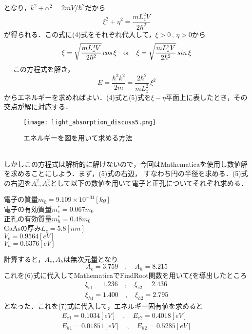 \documentclass[a4paper,11pt,titlepage]{jsarticle}
\begin{document}
となり，$k^2+\alpha^2 = 2mV/\hbar^2$だから\\
\begin{equation}
    \xi^2 + \eta^2 = \frac{mL_z^2V}{2\hbar^2} %
\end{equation}
が得られる．この式に(4)式をそれぞれ代入して，$\xi > 0\,,\,\eta > 0$から
\begin{equation}
    \xi=\sqrt{\frac{mL_z^2V}{2\hbar^2}}\,cos\,\xi\quad{\rm or}\quad \xi=\sqrt{\frac{mL_z^2V}{2\hbar^2}}\,sin\,\xi
\end{equation}　%
この方程式を解き，
\begin{equation}
    E = \frac{\hbar^2k^2}{2m} = \frac{2\hbar^2}{mL_z^2}\,\xi^2 %
\end{equation}
からエネルギーを求めればよい．(4)式と(5)式を$\xi - \eta$平面上に表したとき，その交点が解に対応する．
\begin{figure}[h]
    \centering
    \texttt{[image: light\_absorption\_discuss5.png]}
    \caption{エネルギーを図を用いて求める方法}
\end{figure}\\
しかしこの方程式は解析的に解けないので，今回はMathematicaを使用し数値解を求めることにしよう．まず，(5)式の右辺，
すなわち円の半径を求める．(5)式の右辺を$A_e^2,A_h^2$として以下の数値を用いて電子と正孔についてそれぞれ求める．
\begin{center}
    電子の質量$m_0=9.109\times 10^{-31}[kg]$\\
    電子の有効質量$m_e^* = 0.067m_0$\\
    正孔の有効質量$m_h^* = 0.48m_0$\\
    GaAsの厚み$L_z = 5.8[nm]$\\
    $V_e = 0.9564[eV]$\\
    $V_h = 0.6376[eV]$
\end{center}
計算すると，$A_e,A_h$は無次元量となり
\begin{equation}
    A_e = 3.759\quad , \quad A_h = 8.215
\end{equation}
これを(6)式に代入してMathematicaでFindRoot関数を用いて$\xi$を導出したところ
\begin{equation}
    \begin{split}
        \xi_{e1} = 1.236\quad , \quad \xi_{e2} = 2.436\\
        \xi_{h1} = 1.400\quad , \quad \xi_{h2} = 2.795
    \end{split}
\end{equation}
となった．これを(7)式に代入して，エネルギー固有値を求めると
\begin{equation}
    \begin{split}
        E_{e1} = 0.1034[eV]\quad , \quad E_{e2} = 0.4018[eV]\\
        E_{h1} = 0.01851[eV]\quad , \quad E_{h2} = 0.5285[eV]
    \end{split}
\end{equation}
\end{document}
